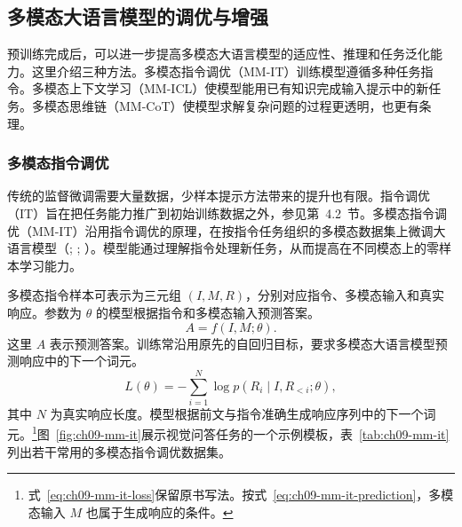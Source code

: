 \subsection{多模态大语言模型的调优与增强}
预训练完成后，可以进一步提高多模态大语言模型的适应性、推理和任务泛化能力。这里介绍三种方法。多模态指令调优（MM-IT）训练模型遵循多种任务指令。多模态上下文学习（MM-ICL）使模型能用已有知识完成输入提示中的新任务。多模态思维链（MM-CoT）使模型求解复杂问题的过程更透明，也更有条理。

\subsubsection{多模态指令调优}
\label{sec:ch09-mm-it}
\begin{keypoint}
传统的监督微调需要大量数据，少样本提示方法带来的提升也有限。指令调优（IT）旨在把任务能力推广到初始训练数据之外，参见第~4.2~节。多模态指令调优（MM-IT）沿用指令调优的原理，在按指令任务组织的多模态数据集上微调大语言模型（; ; ）。模型能通过理解指令处理新任务，从而提高在不同模态上的零样本学习能力。
\end{keypoint}

多模态指令样本可表示为三元组 $(I,M,R)$，分别对应指令、多模态输入和真实响应。参数为 $\theta$ 的模型根据指令和多模态输入预测答案。
\begin{equation}
A=f(I,M;\theta).
\label{eq:ch09-mm-it-prediction}
\end{equation}
这里 $A$ 表示预测答案。训练常沿用原先的自回归目标，要求多模态大语言模型预测响应中的下一个词元。
\begin{equation}
L(\theta)=-\sum_{i=1}^N\log p(R_i\mid I,R_{<i};\theta),
\label{eq:ch09-mm-it-loss}
\end{equation}
其中 $N$ 为真实响应长度。模型根据前文与指令准确生成响应序列中的下一个词元。\footnote{式~\eqref{eq:ch09-mm-it-loss}保留原书写法。按式~\eqref{eq:ch09-mm-it-prediction}，多模态输入 $M$ 也属于生成响应的条件。}图~\ref{fig:ch09-mm-it}展示视觉问答任务的一个示例模板，表~\ref{tab:ch09-mm-it}列出若干常用的多模态指令调优数据集。


